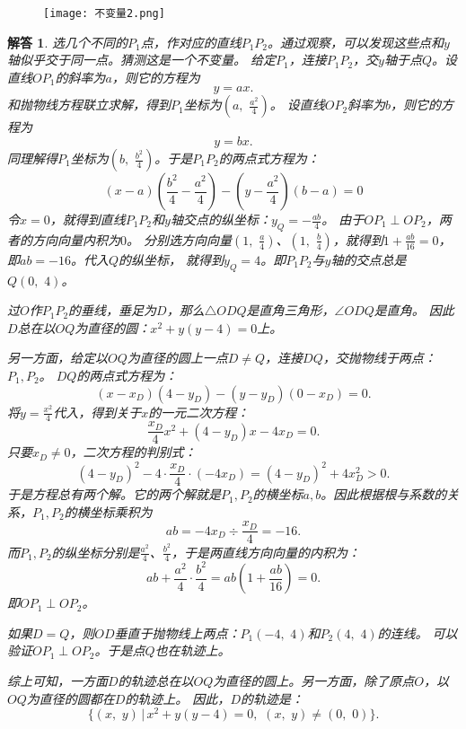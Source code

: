 \documentclass[12pt,UTF8]{ctexbook}
\newtheorem*{so}{解答}
\begin{document}
\begin{figure}[H] %
    \vspace{4pt}
    \centering
    \texttt{[image: 不变量2.png]}
\end{figure}

\begin{so}
    选几个不同的$P_1$点，作对应的直线$P_1P_2$。通过观察，可以发现这些点和$y$轴似乎交于同一点。猜测这是一个不变量。
    给定$P_1$，连接$P_1P_2$，交$y$轴于点$Q$。设直线$OP_1$的斜率为$a$，则它的方程为
    $$ y = ax. $$
    和抛物线方程联立求解，得到$P_1$坐标为$(a, \,\, \frac{a^2}{4})$。
    设直线$OP_2$斜率为$b$，则它的方程为
    $$ y = bx. $$
    同理解得$P_1$坐标为$(b, \,\, \frac{b^2}{4})$。于是$P_1P_2$的两点式方程为：
    $$ (x - a)(\frac{b^2}{4} - \frac{a^2}{4}) - (y - \frac{a^2}{4})(b - a) = 0$$
    令$x=0$，就得到直线$P_1P_2$和$y$轴交点的纵坐标：$y_Q = -\frac{ab}{4}$。
    由于$OP_1 \perp OP_2$，两者的方向向量内积为$0$。
    分别选方向向量$(1,\,\,\frac{a}{4})$、$(1,\,\,\frac{b}{4})$，就得到$1 + \frac{ab}{16} = 0$，即$ab = -16$。代入$Q$的纵坐标，
    就得到$y_Q = 4$。即$P_1P_2$与$y$轴的交点总是$Q(0,\,\,4)$。

    过$O$作$P_1P_2$的垂线，垂足为$D$，那么$\triangle ODQ$是直角三角形，$\angle ODQ$是直角。
    因此$D$总在以$OQ$为直径的圆：$x^2 + y(y-4) = 0$上。

    另一方面，给定以$OQ$为直径的圆上一点$D\neq Q$，连接$DQ$，交抛物线于两点：$P_1,P_2$。
    $DQ$的两点式方程为：
    $$ (x - x_D)(4 - y_D) - (y - y_D)(0 - x_D) = 0.$$
    将$y = \frac{x^2}{4}$代入，得到关于$x$的一元二次方程：
    $$ \frac{x_D}{4}x^2 + \left(4 - y_D\right)x - 4x_D = 0.$$
    只要$x_D\neq 0$，二次方程的判别式：
    $$ (4 - y_D)^2 - 4\cdot \frac{x_D}{4}\cdot(- 4x_D) = (4 - y_D)^2 + 4x_D^2 > 0.$$
    于是方程总有两个解。它的两个解就是$P_1,P_2$的横坐标$a,b$。因此根据根与系数的关系，$P_1,P_2$的横坐标乘积为
    $$ab = -4x_D \div \frac{x_D}{4} = -16.$$
    而$P_1,P_2$的纵坐标分别是$\frac{a^2}{4}$、$\frac{b^2}{4}$，于是两直线方向向量的内积为：
    $$ ab + \frac{a^2}{4}\cdot\frac{b^2}{4} = ab(1 + \frac{ab}{16}) = 0.$$
    即$OP_1 \perp OP_2$。
    
    如果$D=Q$，则$OD$垂直于抛物线上两点：$P_1(-4,\,\,4)$和$P_2(4,\,\,4)$的连线。
    可以验证$OP_1\perp OP_2$。于是点$Q$也在轨迹上。
    
    综上可知，一方面$D$的轨迹总在以$OQ$为直径的圆上。另一方面，除了原点$O$，以$OQ$为直径的圆都在$D$的轨迹上。
    因此，$D$的轨迹是：
    $$\{(x,\,\,y) \, | \, x^2 + y(y-4) = 0, \,\, (x,\,\,y)\neq (0,\,\,0)\}.$$
\end{so}
\end{document}
